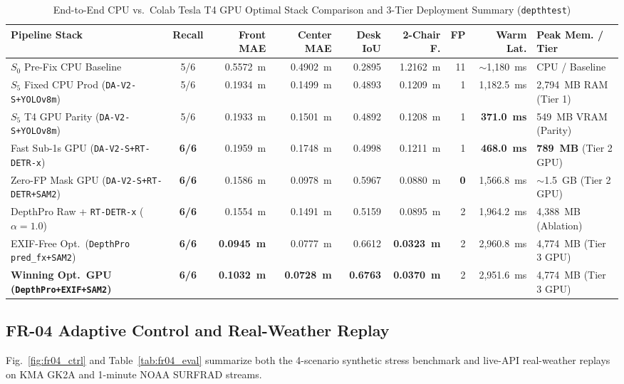 \documentclass[conference]{IEEEtran}
\begin{document}
\begin{table}[!tbp]
\caption{End-to-End CPU vs.\ Colab Tesla T4 GPU Optimal Stack Comparison and 3-Tier Deployment Summary (\texttt{depthtest})}
\label{tab:depthtest_gpu}
\centering
\scriptsize
\setlength{\tabcolsep}{3.4pt}
\renewcommand{\arraystretch}{1.08}
\begin{tabular}{@{}lcrrrrrrl@{}}
\toprule
\textbf{Pipeline Stack} & \textbf{Recall} & \textbf{Front MAE} & \textbf{Center MAE} & \textbf{Desk IoU} & \textbf{2-Chair F.} & \textbf{FP} & \textbf{Warm Lat.} & \textbf{Peak Mem. / Tier} \\
\midrule
$S_0$ Pre-Fix CPU Baseline & 5/6 & 0.5572~m & 0.4902~m & 0.2895 & 1.2162~m & 11 & $\sim$1,180~ms & CPU / Baseline \\
$S_5$ Fixed CPU Prod (\texttt{DA-V2-S+YOLOv8m}) & 5/6 & 0.1934~m & 0.1499~m & 0.4893 & 0.1209~m & 1 & 1,182.5~ms & 2,794~MB RAM (Tier 1) \\
$S_5$ T4 GPU Parity (\texttt{DA-V2-S+YOLOv8m}) & 5/6 & 0.1933~m & 0.1501~m & 0.4892 & 0.1208~m & 1 & \textbf{371.0~ms} & 549~MB VRAM (Parity) \\
Fast Sub-1s GPU (\texttt{DA-V2-S+RT-DETR-x}) & \textbf{6/6} & 0.1959~m & 0.1748~m & 0.4998 & 0.1211~m & 1 & \textbf{468.0~ms} & \textbf{789~MB} (Tier 2 GPU) \\
Zero-FP Mask GPU (\texttt{DA-V2-S+RT-DETR+SAM2}) & \textbf{6/6} & 0.1586~m & 0.0978~m & 0.5967 & 0.0880~m & \textbf{0} & 1,566.8~ms & $\sim$1.5~GB (Tier 2 GPU) \\
DepthPro Raw + \texttt{RT-DETR-x} ($\alpha=1.0$) & \textbf{6/6} & 0.1554~m & 0.1491~m & 0.5159 & 0.0895~m & 2 & 1,964.2~ms & 4,388~MB (Ablation) \\
EXIF-Free Opt.\ (\texttt{DepthPro pred\_fx+SAM2}) & \textbf{6/6} & \textbf{0.0945~m} & 0.0777~m & 0.6612 & \textbf{0.0323~m} & 2 & 2,960.8~ms & 4,774~MB (Tier 3 GPU) \\
\textbf{Winning Opt.\ GPU (\texttt{DepthPro+EXIF+SAM2})} & \textbf{6/6} & \textbf{0.1032~m} & \textbf{0.0728~m} & \textbf{0.6763} & \textbf{0.0370~m} & 2 & 2,951.6~ms & 4,774~MB (Tier 3 GPU) \\
\bottomrule
\end{tabular}
\end{table}

\subsection{FR-04 Adaptive Control and Real-Weather Replay}
Fig.~\ref{fig:fr04_ctrl} and Table~\ref{tab:fr04_eval} summarize both the 4-scenario synthetic stress benchmark and live-API real-weather replays on KMA GK2A and 1-minute NOAA SURFRAD streams.
\end{document}
